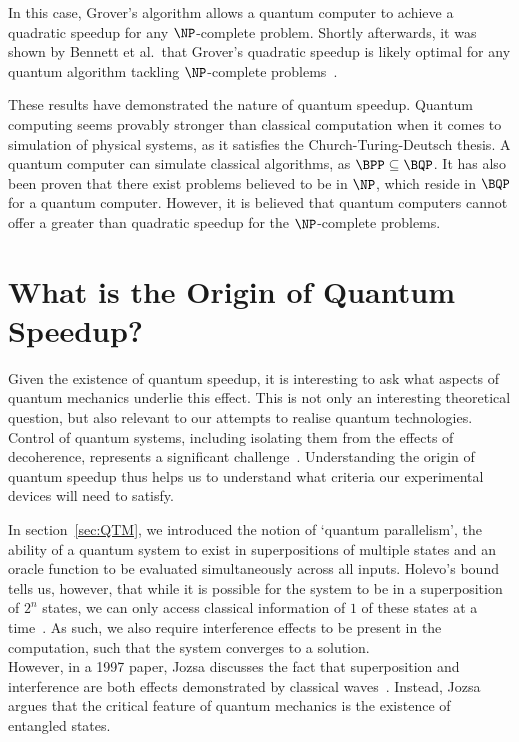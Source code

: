 \documentclass{standalone}
\begin{document}
In this case, Grover's algorithm allows a quantum computer to achieve a quadratic speedup for any $\NP$-complete problem. Shortly afterwards, it was shown by Bennett et al.\ that Grover's quadratic speedup is likely optimal for any quantum algorithm tackling $\NP$-complete problems~\cite{Bennett1997}.
\par
These results have demonstrated the nature of quantum speedup. Quantum computing seems provably stronger than classical computation when it comes to simulation of physical systems, as it satisfies the Church-Turing-Deutsch thesis. A quantum computer can simulate classical algorithms, as $\BPP\subseteq\BQP$. It has also been proven that there exist problems believed to be in $\NP$, which reside in $\BQP$ for a quantum computer. However, it is believed that quantum computers cannot offer a greater than quadratic speedup for the $\NP$-complete problems. 

\section{What is the Origin of Quantum Speedup?}
Given the existence of quantum speedup, it is interesting to ask what aspects of quantum mechanics underlie this effect. This is not only an interesting theoretical question, but also relevant to our attempts to realise quantum technologies. Control of quantum systems, including isolating them from the effects of decoherence, represents a significant challenge~\cite{Shor1997}. Understanding the origin of quantum speedup thus helps us to understand what criteria our experimental devices will need to satisfy.
\par
In section~\ref{sec:QTM}, we introduced the notion of `quantum parallelism', the ability of a quantum system to exist in superpositions of multiple states and an oracle function to be evaluated simultaneously across all inputs. Holevo's bound tells us, however, that while it is possible for the system to be in a superposition of $2^{n}$ states, we can only access classical information of $1$ of these states at a time~\cite{holevo1973}. As such, we also require interference effects to be present in the computation, such that the system converges to a solution.\\
However, in a 1997 paper, Jozsa discusses the fact that superposition and interference are both effects demonstrated by classical waves~\cite{Jozsa1997}. Instead, Jozsa argues that the critical feature of quantum mechanics is the existence of entangled states. 
\end{document}
